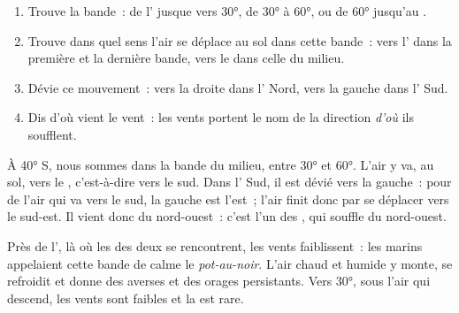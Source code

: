 \begin{method}\label{met:g8:winds-global-circulation:wind}
\begin{enumerate}
  \item Trouve la bande~: de l' jusque vers \ang{30}, de \ang{30}
        à \ang{60}, ou de \ang{60} jusqu'au .
  \item Trouve dans quel sens l'air se déplace au sol dans cette bande~:
        vers l' dans la première et la dernière bande, vers le 
        dans celle du milieu.
  \item Dévie ce mouvement~: vers la droite dans l' Nord, vers
        la gauche dans l' Sud.
  \item Dis d'où vient le vent~: les vents portent le nom de la direction
        \emph{d'où} ils soufflent.
\end{enumerate}
\end{method}

\begin{example}\label{ex:g8:winds-global-circulation:40s}
À \ang{40} S, nous sommes dans la bande du milieu, entre \ang{30} et
\ang{60}. L'air y va, au sol, vers le , c'est-à-dire vers le sud. Dans
l' Sud, il est dévié vers la gauche~: pour de l'air qui va vers
le sud, la gauche est l'est~; l'air finit donc par se déplacer vers le
sud-est. Il vient donc du nord-ouest~: c'est l'un des , qui
souffle du nord-ouest.
\end{example}

Près de l', là où les  des deux  se rencontrent,
les vents faiblissent~: les marins appelaient cette bande de calme le
\emph{pot-au-noir}. L'air chaud et humide y monte, se refroidit et donne
des averses et des orages persistants. Vers \ang{30}, sous l'air qui
descend, les vents sont faibles et la  est rare.

